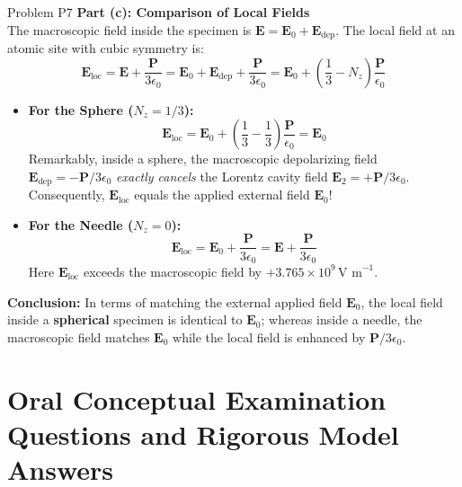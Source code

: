 \documentclass[11pt,a4paper]{article}
\begin{document}
\begin{solbox}{Problem P7}
\textbf{Part (c): Comparison of Local Fields} \\
The macroscopic field inside the specimen is $\mathbf{E} = \mathbf{E}_0 + \mathbf{E}_{\text{dep}}$.
The local field at an atomic site with cubic symmetry is:
\begin{equation}
    \mathbf{E}_{\text{loc}} = \mathbf{E} + \frac{\mathbf{P}}{3\epsilon_0} = \mathbf{E}_0 + \mathbf{E}_{\text{dep}} + \frac{\mathbf{P}}{3\epsilon_0} = \mathbf{E}_0 + \left(\frac{1}{3} - N_z\right)\frac{\mathbf{P}}{\epsilon_0}
\end{equation}
\begin{itemize}
    \item \textbf{For the Sphere ($N_z = 1/3$):}
    \begin{equation}
        \mathbf{E}_{\text{loc}} = \mathbf{E}_0 + \left(\frac{1}{3} - \frac{1}{3}\right)\frac{\mathbf{P}}{\epsilon_0} = \mathbf{E}_0
    \end{equation}
    Remarkably, inside a sphere, the macroscopic depolarizing field $\mathbf{E}_{\text{dep}} = -\mathbf{P}/3\epsilon_0$ \emph{exactly cancels} the Lorentz cavity field $\mathbf{E}_2 = +\mathbf{P}/3\epsilon_0$. Consequently, $\mathbf{E}_{\text{loc}}$ equals the applied external field $\mathbf{E}_0$!
    \item \textbf{For the Needle ($N_z = 0$):}
    \begin{equation}
        \mathbf{E}_{\text{loc}} = \mathbf{E}_0 + \frac{\mathbf{P}}{3\epsilon_0} = \mathbf{E} + \frac{\mathbf{P}}{3\epsilon_0}
    \end{equation}
    Here $\mathbf{E}_{\text{loc}}$ exceeds the macroscopic field by $+3.765 \times 10^9\,\text{V m}^{-1}$.
\end{itemize}
\textbf{Conclusion:} In terms of matching the external applied field $\mathbf{E}_0$, the local field inside a \textbf{spherical} specimen is identical to $\mathbf{E}_0$; whereas inside a needle, the macroscopic field matches $\mathbf{E}_0$ while the local field is enhanced by $\mathbf{P}/3\epsilon_0$.
\end{solbox}

\newpage
\section{Oral Conceptual Examination Questions and Rigorous Model Answers}
\label{sec:viva_questions}
\end{document}
